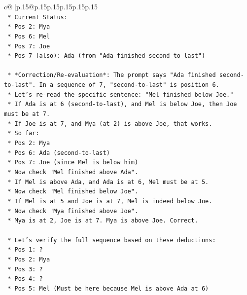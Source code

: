 \documentclass{article}
\begin{document}
{\begin{supertabular}{c@{$\;$}|p{.15\linewidth}@{}p{.15\linewidth}p{.15\linewidth}p{.15\linewidth}p{.15\linewidth}p{.15\linewidth}}
{{{\\ 
\texttt{    *   Current Status:} \\
\texttt{        *   Pos 2: Mya} \\
\texttt{        *   Pos 6: Mel} \\
\texttt{        *   Pos 7: Joe} \\
\texttt{        *   Pos 7 (also): Ada (from "Ada finished second{-}to{-}last")} \\
\\ 
\texttt{    *   *Correction/Re{-}evaluation*: The prompt says "Ada finished second{-}to{-}last". In a sequence of 7, "second{-}to{-}last" is position 6.} \\
\texttt{    *   Let's re{-}read the specific sentence: "Mel finished below Joe."} \\
\texttt{    *   If Ada is at 6 (second{-}to{-}last), and Mel is below Joe, then Joe must be at 7.} \\
\texttt{    *   If Joe is at 7, and Mya (at 2) is above Joe, that works.} \\
\texttt{    *   So far:} \\
\texttt{        *   Pos 2: Mya} \\
\texttt{        *   Pos 6: Ada (second{-}to{-}last)} \\
\texttt{        *   Pos 7: Joe (since Mel is below him)} \\
\texttt{    *   Now check "Mel finished above Ada".} \\
\texttt{        *   If Mel is above Ada, and Ada is at 6, Mel must be at 5.} \\
\texttt{    *   Now check "Mel finished below Joe".} \\
\texttt{        *   If Mel is at 5 and Joe is at 7, Mel is indeed below Joe.} \\
\texttt{    *   Now check "Mya finished above Joe".} \\
\texttt{        *   Mya is at 2, Joe is at 7. Mya is above Joe. Correct.} \\
\\ 
\texttt{    *   Let's verify the full sequence based on these deductions:} \\
\texttt{        *   Pos 1: ?} \\
\texttt{        *   Pos 2: Mya} \\
\texttt{        *   Pos 3: ?} \\
\texttt{        *   Pos 4: ?} \\
\texttt{        *   Pos 5: Mel (Must be here because Mel is above Ada at 6)} \\
}}}
\end{supertabular}}
\end{document}
